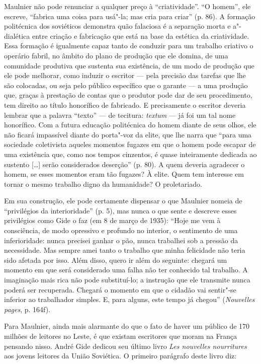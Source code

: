 Maulnier não pode renunciar a qualquer preço à ``criatividade''. ``O
homem'', ele escreve, ``fabrica uma coisa para usá"-la; mas cria para
criar'' (p. 86). A formação politécnica dos soviéticos demonstra quão falaciosa é a separação morta e a"-dialética entre
criação e fabricação que está na base da estética da criatividade.
Essa formação é
igualmente capaz tanto de conduzir para um trabalho criativo o operário
fabril, no âmbito do plano de produção que ele domina, de uma comunidade
produtiva que sustenta sua existência, de um modo de produção que ele
pode melhorar, como induzir o escritor --- pela precisão das tarefas que
lhe são colocadas, ou seja pelo público específico que o garante --- a
uma produção que, graças à prestação de contas que o produtor pode dar
de seu procedimento, tem direito ao título honorífico de fabricado. E
precisamente o escritor deveria lembrar que a palavra ``texto'' --- de
tecitura: \emph{textum} --- já foi um tal nome honorífico. Com a futura
educação politécnica do homem diante de seus olhos, ele não ficará
impassível diante do porta"-voz da elite, que lhe narra que ``para uma
sociedade coletivista aqueles momentos fugazes em que o homem pode
escapar de uma existência que, como nos tempos cinzentos, é quase
inteiramente dedicada ao sustento {[}\ldots{}{]} serão considerados deserção''
(p. 80). A quem deveria agradecer o homem, se esses momentos eram tão
fugazes? À elite. Quem tem interesse em tornar o mesmo trabalho digno da
humanidade? O proletariado.

Em sua construção, ele pode certamente dispensar o que
Maulnier nomeia de ``privilégios da interioridade'' (p. 5), mas nunca
o que sente e descreve esses privilégios como Gide o faz (em 8 de
março de 1935): ``Hoje me vem à consciência, de modo opressivo e
profundo no interior, o sentimento de uma inferioridade: nunca precisei
ganhar o pão, nunca trabalhei sob a pressão da necessidade. Mas sempre
amei tanto o trabalho que minha felicidade não teria sido afetada por
isso. Além disso, quero ir além do seguinte: chegará um momento em que
será considerado uma falha não ter conhecido tal trabalho. A imaginação
mais rica não pode substituí-lo; a instrução que ele transmite nunca
poderá ser recuperada. Chegará o momento em que o cidadão vai sentir"-se
inferior ao trabalhador simples. E, para alguns, este tempo já chegou''
(\emph{Nouvelles pages}, p. 164f).

Para Maulnier, ainda mais alarmante do que o fato de haver um público de
170 milhões de leitores no Leste, é que existam escritores que moram na
França pensando nisso. André Gide dedicou seu último livro \emph{Les
nouvelles nourritures} aos jovens leitores da União Soviética. O
primeiro parágrafo deste livro diz:

